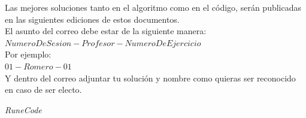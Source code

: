 \documentclass{article}
\begin{document}
Las mejores soluciones tanto en el algoritmo como en el código, serán
publicadas en las siguientes ediciones de estos documentos.\\

El asunto del correo debe estar de la siguiente manera:\\
$NumeroDeSesion-Profesor-NumeroDeEjercicio$ \\
Por ejemplo:  \\
$01-Romero-01$ \\

Y dentro del correo adjuntar tu solución y nombre como quieras ser reconocido en caso de ser electo.

\vspace{2cm}
\LARGE\textit{RuneCode}
\end{document}
